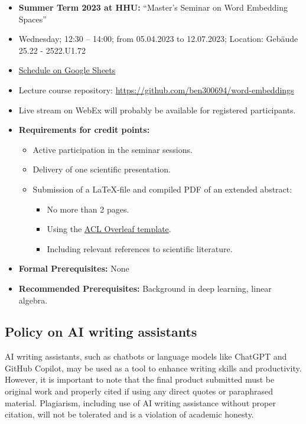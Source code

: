 \documentclass[11pt, a4paper]{amsart}
\begin{document}
\begin{itemize}
    \item \textbf{Summer Term 2023 at HHU:} 
     ``Master's Seminar on Word Embedding Spaces''
    \item Wednesday; 12:30 -- 14:00; from 05.04.2023 to 12.07.2023; Location: Gebäude 25.22 - 2522.U1.72
    \item \href{https://docs.google.com/spreadsheets/d/1V-d-QuJIUniPq9q-Xviu_TdLZHlW_xzBTqhDX_lIG9w/edit?usp=sharing}{Schedule on Google Sheets}
    \item Lecture course repository: \url{https://github.com/ben300694/word-embeddings}
    \item Live stream on WebEx will probably be available for registered participants.
    \item \textbf{Requirements for credit points:}
    \begin{itemize}
        \item Active participation in the seminar sessions. 
        \item Delivery of one scientific presentation.
        \item Submission of a  \LaTeX-file and compiled PDF of an extended abstract:
        \begin{itemize}
        	\item No more than 2 pages.
        	\item Using the \href{https://www.overleaf.com/latex/templates/acl-2020-proceedings-template/zsrkcwjptpcd}{ACL Overleaf template}.
        	\item Including relevant references to scientific literature.
        \end{itemize}
    \end{itemize}
    \item \textbf{Formal Prerequisites:} None
    \item \textbf{Recommended Prerequisites:}
    Background in deep learning,
    linear algebra.
\end{itemize}

\subsection*{Policy on AI writing assistants}

AI writing assistants, such as chatbots or language models like ChatGPT \cite{ChatGPT} and GitHub Copilot, may be used as a tool to enhance writing skills and productivity.
However, it is important to note that the final product submitted must be original work and properly cited if using any direct quotes or paraphrased material.
Plagiarism, including use of AI writing assistance without proper citation, will not be tolerated and is a violation of academic honesty.
\end{document}
